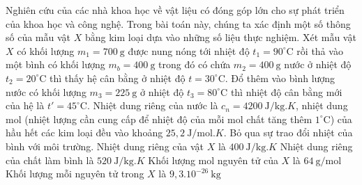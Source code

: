 \begin{ex}
Nghiên cứu của các nhà khoa học về vật liệu có đóng góp lớn cho sự phát triển của khoa học và công nghệ. Trong bài toán này, chúng ta xác định một số thông số của mẫu vật $X$ bằng kim loại dựa vào những số liệu thực nghiệm.
	Xét mẫu vật $X$ có khối lượng $m_1=700\ \mathrm{g}$ được nung nóng tới nhiệt độ $t_1=90^\circ \mathrm{C}$ rồi thả vào một bình có khối lượng $m_b=400\ \mathrm{g}$ trong đó có chứa $m_2=400\ \mathrm{g}$ nước ở nhiệt độ $t_2=20^\circ \mathrm{C}$ thì thấy hệ cân bằng ở nhiệt độ $t=30^\circ \mathrm{C}$. Đổ thêm vào bình lượng nước có khối lượng $m_3=225\ \mathrm{g}$ ở nhiệt độ $t_3=80^\circ \mathrm{C}$ thì nhiệt độ cân bằng mới của hệ là $t'=45^\circ \mathrm{C}$. Nhiệt dung riêng của nước là $c_n=4200\ \mathrm{J/kg}.K$, nhiệt dung mol (nhiệt lượng cần cung cấp để nhiệt độ của mỗi mol chất tăng thêm $1^\circ \mathrm{C}$) của hầu hết các kim loại đều vào khoảng $25,2\ \mathrm{J/mol}.K$. Bỏ qua sự trao đổi nhiệt của bình với môi trường.
\choiceTF
{Nhiệt dung riêng của vật $X$ là $400\ \mathrm{J/kg}.K$}
{Nhiệt dung riêng của chất làm bình là $520\ \mathrm{J/kg}.K$}
{Khối lượng mol nguyên tử của $X$ là $64\ \mathrm{g/mol}$}
{\True Khối lượng mỗi nguyên tử trong $X$ là $9,3.10^{-26}\ \mathrm{kg}$}
\end{ex}


